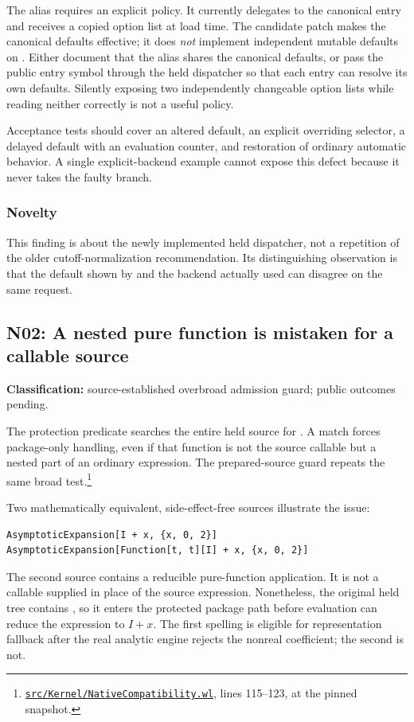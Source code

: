 \documentclass[11pt,letterpaper]{article}
\newcommand{\code}[1]{\texttt{\detokenize{#1}}}
\newcommand{\sr}[3]{\footnote{\href{https://github.com/VladimirReshetnikov/Asymptotic/blob/6687962f3c858a4f93623cfc496f33e35c6763d4/#1\#L#2-L#3}{\nolinkurl{#1}}, lines #2--#3, at the pinned snapshot.}}
\newcommand{\finding}[3]{\subsection{#1: #2}\textbf{Classification:} #3.\par}
\begin{document}
The alias requires an explicit policy. It currently delegates to the canonical entry and receives a copied option list at load time. The candidate patch makes the canonical defaults effective; it does \emph{not} implement independent mutable defaults on \code{AsymptoticExpand}. Either document that the alias shares the canonical defaults, or pass the public entry symbol through the held dispatcher so that each entry can resolve its own defaults. Silently exposing two independently changeable option lists while reading neither correctly is not a useful policy.

Acceptance tests should cover an altered default, an explicit overriding selector, a delayed default with an evaluation counter, and restoration of ordinary automatic behavior. A single explicit-backend example cannot expose this defect because it never takes the faulty branch.

\subsubsection*{Novelty}

This finding is about the newly implemented held dispatcher, not a repetition of the older cutoff-normalization recommendation. Its distinguishing observation is that the default shown by \code{Options} and the backend actually used can disagree on the same request.

\finding{N02}{A nested pure function is mistaken for a callable source}{source-established overbroad admission guard; public outcomes pending}

The protection predicate searches the entire held source for \code{_Function}. A match forces package-only handling, even if that function is not the source callable but a nested part of an ordinary expression. The prepared-source guard repeats the same broad test.\sr{src/Kernel/NativeCompatibility.wl}{115}{123}

Two mathematically equivalent, side-effect-free sources illustrate the issue:
\begin{lstlisting}
AsymptoticExpansion[I + x, {x, 0, 2}]
AsymptoticExpansion[Function[t, t][I] + x, {x, 0, 2}]
\end{lstlisting}
The second source contains a reducible pure-function application. It is not a callable supplied in place of the source expression. Nonetheless, the original held tree contains \code{Function}, so it enters the protected package path before evaluation can reduce the expression to $I+x$. The first spelling is eligible for representation fallback after the real analytic engine rejects the nonreal coefficient; the second is not.
\end{document}
